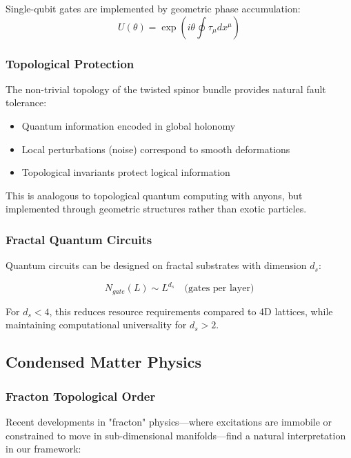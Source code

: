 Single-qubit gates are implemented by geometric phase accumulation:
\begin{equation}
    U(\theta) = \exp\left(i\theta \oint \tau_\mu dx^\mu\right)
\end{equation}

\subsubsection{Topological Protection}

The non-trivial topology of the twisted spinor bundle provides natural fault tolerance:
\begin{itemize}
    \item Quantum information encoded in global holonomy
    \item Local perturbations (noise) correspond to smooth deformations
    \item Topological invariants protect logical information
\end{itemize}

This is analogous to topological quantum computing with anyons, but implemented through geometric structures rather than exotic particles.

\subsubsection{Fractal Quantum Circuits}

Quantum circuits can be designed on fractal substrates with dimension $d_s$:

\begin{equation}
    N_{gate}(L) \sim L^{d_s} \quad \text{(gates per layer)}
\end{equation}

For $d_s < 4$, this reduces resource requirements compared to 4D lattices, while maintaining computational universality for $d_s > 2$.

\subsection{Condensed Matter Physics}

\subsubsection{Fracton Topological Order}

Recent developments in "fracton" physics—where excitations are immobile or constrained to move in sub-dimensional manifolds—find a natural interpretation in our framework:

